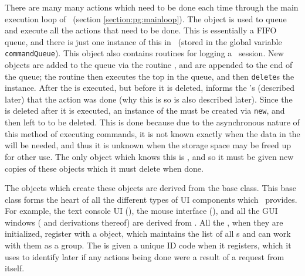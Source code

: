 There are many many actions which need to be done each time through the main execution loop of \VMD\ (section \ref{section:pg:mainloop}).  The  object is used to queue and execute all the actions that need to be done.  This is essentially a FIFO queue, and there is just one instance of this in \VMD\ (stored in the global variable {\tt commandQueue}).  This object also contains routines for logging a \VMD\ session.  New  objects are added to the queue via the routine , and are appended to the end of the queue; the routine  then executes the top  in the queue, and then {\tt delete}s the  instance.  After the  is executed, but before it is deleted,  informs the 's (described later) that the action was done (why this is so is also described later).  Since the  is deleted after it is executed, an instance of the  must be created via {\tt new}, and then left to  to be deleted.  This is done because due to the asynchronous nature of this method of executing commands, it is not known exactly when the data in the  will be needed, and thus it is unknown when the storage space may be freed up for other use.  The only object which knows this is , and so it must be given new copies of these  objects which it must delete when done.

The objects which create these  objects are derived from the  base class.  This base class forms the heart of all the different types of UI components which \VMD\ provides.  For example, the text console UI (), the mouse interface (), and all the GUI windows ( and derivations thereof) are derived from .  All the , when they are initialized, register with a  object, which maintains the list of all s and can work with them as a group.  The  is given a unique ID code when it registers, which it uses to identify later if any actions being done were a result of a request from itself.

